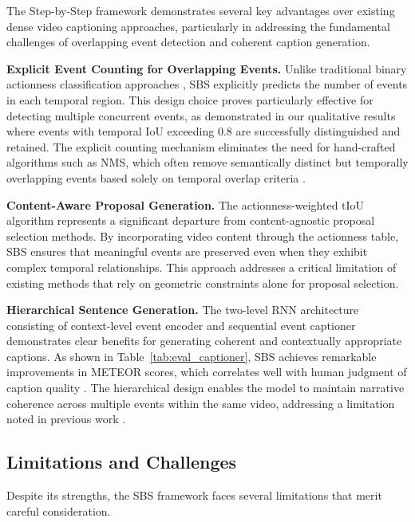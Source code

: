 The Step-by-Step framework demonstrates several key advantages over existing dense video captioning approaches, particularly in addressing the fundamental challenges of overlapping event detection and coherent caption generation.

\textbf{Explicit Event Counting for Overlapping Events.}
Unlike traditional binary actionness classification approaches \cite{lin2018bsn,long2019gaussian}, SBS explicitly predicts the number of events in each temporal region. This design choice proves particularly effective for detecting multiple concurrent events, as demonstrated in our qualitative results where events with temporal IoU exceeding 0.8 are successfully distinguished and retained. The explicit counting mechanism eliminates the need for hand-crafted algorithms such as NMS, which often remove semantically distinct but temporally overlapping events based solely on temporal overlap criteria \cite{hosang2017learning}.

\textbf{Content-Aware Proposal Generation.}
The actionness-weighted tIoU algorithm represents a significant departure from content-agnostic proposal selection methods. By incorporating video content through the actionness table, SBS ensures that meaningful events are preserved even when they exhibit complex temporal relationships. This approach addresses a critical limitation of existing methods \cite{krishna2017dense,wang2018bidirectional} that rely on geometric constraints alone for proposal selection.

\textbf{Hierarchical Sentence Generation.}
The two-level RNN architecture consisting of context-level event encoder and sequential event captioner demonstrates clear benefits for generating coherent and contextually appropriate captions. As shown in Table~\ref{tab:eval_captioner}, SBS achieves remarkable improvements in METEOR scores, which correlates well with human judgment of caption quality \cite{banerjee2005meteor}. The hierarchical design enables the model to maintain narrative coherence across multiple events within the same video, addressing a limitation noted in previous work \cite{xiong2018move,lei2020mart}.

\subsection{Limitations and Challenges}

Despite its strengths, the SBS framework faces several limitations that merit careful consideration.

